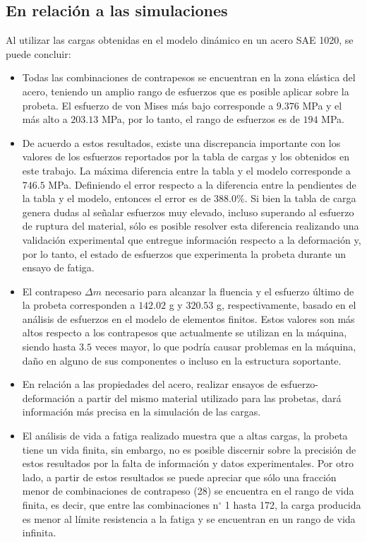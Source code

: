 \subsection{En relación a las simulaciones}
Al utilizar las cargas obtenidas en el modelo dinámico en un acero SAE 1020, se puede concluir:
\begin{itemize}
	\item Todas las combinaciones de contrapesos se encuentran en la zona elástica del acero, teniendo un amplio rango de esfuerzos que es posible aplicar sobre la probeta. El esfuerzo de von Mises más bajo corresponde a $9.376$ MPa y el más alto a $203.13$ MPa, por lo tanto, el rango de esfuerzos es de $194$ MPa. 
	\item De acuerdo a estos resultados, existe una discrepancia importante con los valores de los esfuerzos reportados por la tabla de cargas y los obtenidos en este trabajo. La máxima diferencia entre la tabla y el modelo corresponde a $746.5$ MPa. Definiendo el error respecto a la diferencia entre la pendientes de la tabla y el modelo, entonces el error es de $388.0 \%$. Si bien la tabla de carga genera dudas al señalar esfuerzos muy elevado, incluso superando al esfuerzo de ruptura del material, sólo es posible resolver esta diferencia realizando una validación experimental que entregue información respecto a la deformación y, por lo tanto, el estado de esfuerzos que experimenta la probeta durante un ensayo de fatiga. 
	\item El contrapeso $\Delta m$ necesario para alcanzar la fluencia y el esfuerzo último de la probeta corresponden a $142.02$ g y $320.53$ g, respectivamente, basado en el análisis de esfuerzos en el modelo de elementos finitos. Estos valores son más altos respecto a los contrapesos que actualmente se utilizan en la máquina, siendo hasta $3.5$ veces mayor, lo que podría causar problemas en la máquina, daño en alguno de sus componentes o incluso en la estructura soportante.
	\item En relación a las propiedades del acero, realizar ensayos de esfuerzo-deformación a partir del mismo material utilizado para las probetas, dará información más precisa en la simulación de las cargas.
	\item El análisis de vida a fatiga realizado muestra que a altas cargas, la probeta tiene un vida finita, sin embargo, no es posible discernir sobre la precisión de estos resultados por la falta de información y datos experimentales. Por otro lado, a partir de estos resultados se puede apreciar que sólo una fracción menor de combinaciones de contrapeso (28) se encuentra en el rango de vida finita, es decir, que entre las combinaciones n$^{\circ}$ 1 hasta 172, la carga producida es menor al límite resistencia a la fatiga y se encuentran en un rango de vida infinita.  

\end{itemize}
